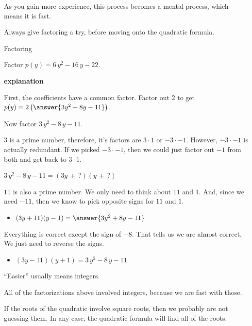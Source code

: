 \documentclass{ximera}
\begin{document}
As you gain more experience, this process becomes a mental process, which means it is fast. 


Always give factoring a try, before moving onto the quadratic formula. 






\begin{example} Factoring

Factor $p(y) = 6 \, y^2 - 16 \, y - 22$.

\textbf{\textcolor{red!75!green}{explanation}} 

First, the coefficients have a common factor.  Factor out $2$ to get $p(y) = 2 \left( \answer{3 y^2 - 8 y - 11} \right)$.


Now factor $3 \, y^2 - 8 \, y - 11$.



$3$ is a prime number, therefore, it's factors are $3 \cdot 1$ or $-3 \cdot -1$. However, $-3 \cdot -1$ is actually redundant.  If we picked $-3 \cdot -1$, then we could just factor out $-1$ from both and get back to $3 \cdot 1$.


$3 \, y^2 - 8 \, y - 11 = (3y \, \pm \, ?) (y \, \pm \, ?) $


$11$ is also a prime number. We only need to think about $11$ and $1$. And, since we need $-11$, then we know to pick opposite signs for $11$ and $1$.



\begin{itemize}
\item $(3y + 11) (y - 1) = \answer{3 y^2 + 8 y - 11}$
\end{itemize}

Everything is correct except the sign of $-8$. That tells us we are almost correct. We just need to reverse the signs.


\begin{itemize}
\item $(3y - 11) (y + 1) = 3 \, y^2 - 8 \, y - 11$
\end{itemize}





\end{example}


``Easier'' usually means integers.  

All of the factorizations above involved integers, because we are fast with those. 



If the roots of the quadratic involve square roots, then we probably are not guessing them.  In any case, the quadratic formula will find all of the roots.
\end{document}
